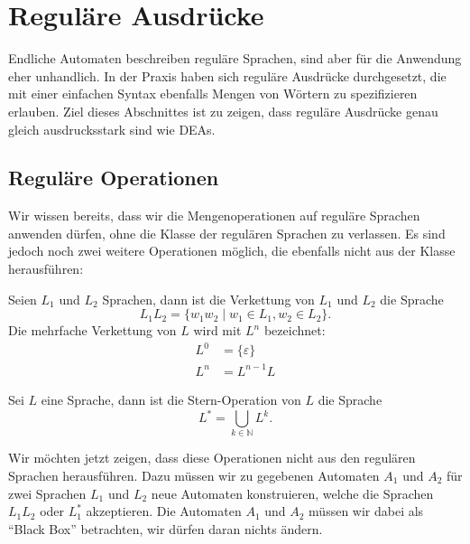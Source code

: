 \section{Reguläre Ausdrücke\label{regulaer:re}}
%
Endliche Automaten beschreiben reguläre Sprachen, sind aber für die
Anwendung eher unhandlich.
In der Praxis haben sich reguläre Ausdrücke
durchgesetzt, die mit einer einfachen Syntax ebenfalls Mengen von
Wörtern zu spezifizieren erlauben.
Ziel dieses Abschnittes ist
zu zeigen, dass reguläre Ausdrücke genau gleich ausdrucksstark sind
wie DEAs.

\subsection{Reguläre Operationen\label{regulaer:regulaere-operationen}}
%
Wir wissen bereits, dass wir die Mengenoperationen auf reguläre
Sprachen anwenden dürfen, ohne die Klasse der regulären Sprachen
zu verlassen.
Es sind jedoch noch zwei weitere Operationen möglich, die ebenfalls
nicht aus der Klasse herausführen:

\begin{definition}
%
Seien $L_1$ und $L_2$ Sprachen, dann ist die
Verkettung von $L_1$ und $L_2$ die Sprache
\[
L_1L_2=\{w_1w_2\;|\;w_1\in L_1,w_2\in L_2\}.
\]
Die mehrfache Verkettung von $L$ wird mit $L^n$ bezeichnet:
\begin{align*}
L^0&=\{\varepsilon\}\\
L^n&=L^{n-1}L
\end{align*}
\end{definition}

\begin{definition}
%
Sei $L$ eine Sprache, dann ist die Stern-Operation
von $L$ die Sprache
\[
L^*=\bigcup_{k\in\mathbb N} L^k.
\]
\end{definition}

Wir möchten jetzt zeigen, dass diese Operationen nicht aus den
regulären Sprachen herausführen.
Dazu müssen wir zu gegebenen Automaten $A_1$ und $A_2$ für zwei Sprachen
$L_1$ und $L_2$ neue Automaten konstruieren, welche
die Sprachen $L_1L_2$ oder $L_1^*$ akzeptieren.
Die Automaten $A_1$ und $A_2$ müssen wir dabei als ``Black Box'' betrachten,
wir dürfen daran nichts ändern.

